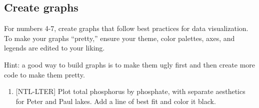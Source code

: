\documentclass[]{article}
\newenvironment{Shaded}{\begin{snugshade}}{\end{snugshade}}
\newcommand{\KeywordTok}[1]{\textcolor[rgb]{0.13,0.29,0.53}{\textbf{#1}}}
\newcommand{\DataTypeTok}[1]{\textcolor[rgb]{0.13,0.29,0.53}{#1}}
\newcommand{\DecValTok}[1]{\textcolor[rgb]{0.00,0.00,0.81}{#1}}
\newcommand{\FloatTok}[1]{\textcolor[rgb]{0.00,0.00,0.81}{#1}}
\newcommand{\StringTok}[1]{\textcolor[rgb]{0.31,0.60,0.02}{#1}}
\newcommand{\CommentTok}[1]{\textcolor[rgb]{0.56,0.35,0.01}{\textit{#1}}}
\newcommand{\OperatorTok}[1]{\textcolor[rgb]{0.81,0.36,0.00}{\textbf{#1}}}
\newcommand{\NormalTok}[1]{#1}
\providecommand{\tightlist}{%
  \setlength{\itemsep}{0pt}\setlength{\parskip}{0pt}}
\begin{document}
\begin{Shaded}
\end{Shaded}

\subsection{Create graphs}\label{create-graphs}

For numbers 4-7, create graphs that follow best practices for data
visualization. To make your graphs ``pretty,'' ensure your theme, color
palettes, axes, and legends are edited to your liking.

Hint: a good way to build graphs is to make them ugly first and then
create more code to make them pretty.

\begin{enumerate}
\def\labelenumi{\arabic{enumi}.}
\setcounter{enumi}{3}
\tightlist
\item
  {[}NTL-LTER{]} Plot total phosphorus by phosphate, with separate
  aesthetics for Peter and Paul lakes. Add a line of best fit and color
  it black.
\end{enumerate}
\end{document}
